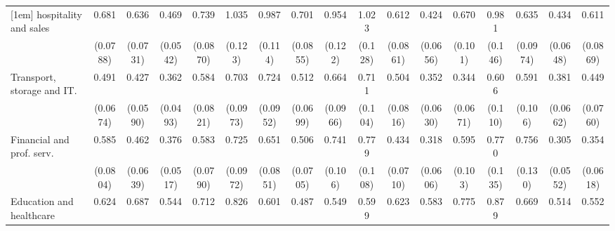 {\begin{tabular}{l*{16}{c}}
[1em]
hospitality and sales&       0.681\sym{***}&       0.636\sym{***}&       0.469\sym{***}&       0.739\sym{*}  &       1.035         &       0.987         &       0.701\sym{**} &       0.954         &       1.023         &       0.612\sym{***}&       0.424\sym{***}&       0.670\sym{**} &       0.981         &       0.635\sym{**} &       0.434\sym{***}&       0.611\sym{***}\\
                    &    (0.0788)         &    (0.0731)         &    (0.0542)         &    (0.0870)         &     (0.123)         &     (0.114)         &    (0.0855)         &     (0.122)         &     (0.128)         &    (0.0861)         &    (0.0656)         &     (0.101)         &     (0.146)         &    (0.0974)         &    (0.0648)         &    (0.0869)         \\
[1em]
Transport, storage and IT.&       0.491\sym{***}&       0.427\sym{***}&       0.362\sym{***}&       0.584\sym{***}&       0.703\sym{*}  &       0.724\sym{*}  &       0.512\sym{***}&       0.664\sym{**} &       0.711\sym{*}  &       0.504\sym{***}&       0.352\sym{***}&       0.344\sym{***}&       0.606\sym{**} &       0.591\sym{**} &       0.381\sym{***}&       0.449\sym{***}\\
                    &    (0.0674)         &    (0.0590)         &    (0.0493)         &    (0.0821)         &    (0.0973)         &    (0.0952)         &    (0.0699)         &    (0.0966)         &     (0.104)         &    (0.0816)         &    (0.0630)         &    (0.0671)         &     (0.110)         &     (0.106)         &    (0.0662)         &    (0.0760)         \\
[1em]
Financial and prof. serv.&       0.585\sym{***}&       0.462\sym{***}&       0.376\sym{***}&       0.583\sym{***}&       0.725\sym{*}  &       0.651\sym{**} &       0.506\sym{***}&       0.741\sym{*}  &       0.779         &       0.434\sym{***}&       0.318\sym{***}&       0.595\sym{**} &       0.770         &       0.756         &       0.305\sym{***}&       0.354\sym{***}\\
                    &    (0.0804)         &    (0.0639)         &    (0.0517)         &    (0.0790)         &    (0.0972)         &    (0.0851)         &    (0.0705)         &     (0.106)         &     (0.108)         &    (0.0710)         &    (0.0606)         &     (0.103)         &     (0.135)         &     (0.130)         &    (0.0552)         &    (0.0618)         \\
[1em]
Education and healthcare&       0.624\sym{***}&       0.687\sym{**} &       0.544\sym{***}&       0.712\sym{*}  &       0.826         &       0.601\sym{***}&       0.487\sym{***}&       0.549\sym{***}&       0.599\sym{***}&       0.623\sym{**} &       0.583\sym{**} &       0.775         &       0.879         &       0.669\sym{*}  &       0.514\sym{***}&       0.552\sym{***}\\

\end{tabular}}
